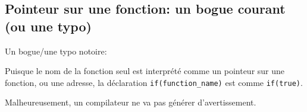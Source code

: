\subsection{Pointeur sur une fonction: un bogue courant (ou une typo)}

Un bogue/une typo notoire:



Puisque le nom de la fonction seul est interprété comme un pointeur sur une fonction,
ou une adresse, la déclaration \verb|if(function_name)| est comme \verb|if(true)|.

Malheureusement, un compilateur \CCpp ne va pas générer d'avertissement.

